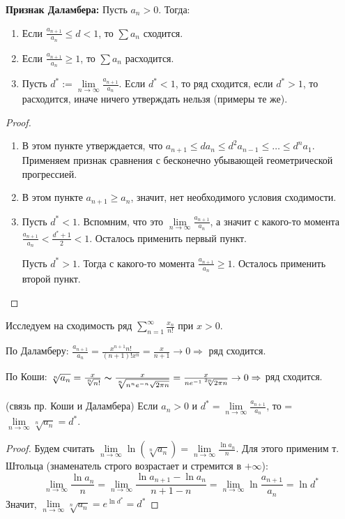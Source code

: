 \textbf{Признак Даламбера:} 
Пусть $a_n > 0$. Тогда: \begin{enumerate}
    \item Если $\frac{a_{n+1}}{a_n} \leqslant d < 1$, то $\sum a_n$ сходится.
    \item Если $\frac{a_{n+1}}{a_n} \geqslant 1$, то $\sum a_n$ расходится.
    \item Пусть $d^* := \lim\limits_{n \to \infty} \frac{a_{n+1}}{a_n}$. Если $d^* < 1$, то ряд сходится, если $d^* > 1$, то расходится, иначе ничего утверждать нельзя (примеры те же).
\end{enumerate}
\begin{proof} \quad

    \begin{enumerate}
        \item В этом пункте утверждается, что $a_{n+1} \leqslant da_n \leqslant d^2a_{n - 1} \leqslant \dots \leqslant d^na_1$. Применяем признак сравнения с бесконечно убывающей геометрической прогрессией.
        \item В этом пункте $a_{n+1} \geqslant a_n$, значит, нет необходимого условия сходимости.
        \item Пусть $d^* < 1$. Вспомним, что это $\lim\limits_{n \to \infty} \frac{a_{n+1}}{a_n}$, а значит с какого-то момента $\frac{a_{n+1}}{a_n} < \frac{d^* + 1}{2} < 1$. Осталось применить первый пункт.
        
        Пусть $d^* > 1$. Тогда с какого-то момента $\frac{a_{n+1}}{a_n} \geqslant 1$. Осталось применить второй пункт.
    \end{enumerate}
\end{proof}

\begin{example}
    Исследуем на сходимость ряд $\sum\limits_{n = 1}^\infty \frac{x_n}{n!}$ при $x > 0$.

    По Даламберу: $\frac{a_{n+1}}{a_n} = \frac{x^{n+1}n!}{(n+1)!x^n} = \frac{x}{n+1} \to 0 \Rightarrow$ ряд сходится.

    По Коши: $\sqrt[n]{a_n} = \frac{x}{\sqrt[n]{n!}} \thicksim \frac{x}{\sqrt[n]{n^ne^{-n}\sqrt{2\pi n}}} = \frac{x}{ne^{-1}\sqrt[2n]{2\pi n}} \to 0 \Rightarrow$ ряд сходится.
\end{example}

\vspace{5mm}


\begin{theorem} (связь пр. Коши и Даламбера)
    Если $a_n > 0$ и $d^* = \lim\limits_{n \to \infty} \frac{a_{n+1}}{a_n}$, то  = $\lim\limits_{n \to \infty} \sqrt[n]{a_n} = d^*$.
\end{theorem}
\begin{proof}
    Будем считать $\lim\limits_{n \to \infty} \ln(\sqrt[n]{a_n}) = \lim\limits_{n \to \infty} \frac{\ln a_n}{n}$.
    Для этого применим т. Штольца (знаменатель строго возрастает и стремится в $+\infty$): \[ \lim\limits_{n \to \infty} \frac{\ln a_n}{n} = \lim\limits_{n \to \infty} \frac{\ln a_{n+1} - \ln a_n}{n + 1 - n} = \lim\limits_{n \to \infty} \ln \frac{a_{n+1}}{a_n} = \ln d^* \]
    \quad Значит, $\lim\limits_{n \to \infty} \sqrt[n]{a_n} = e^{\ln d^*} = d^*$
\end{proof}

